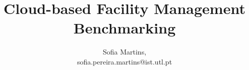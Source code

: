 \documentclass{./llncs2e/llncs}
\begin{document}
\title{Cloud-based Facility Management Benchmarking}

\author{Sofia Martins, \\ sofia.pereira.martins@ist.utl.pt}

\maketitle










 
\newpage
\appendix




% 
% 

% 
\end{document}
